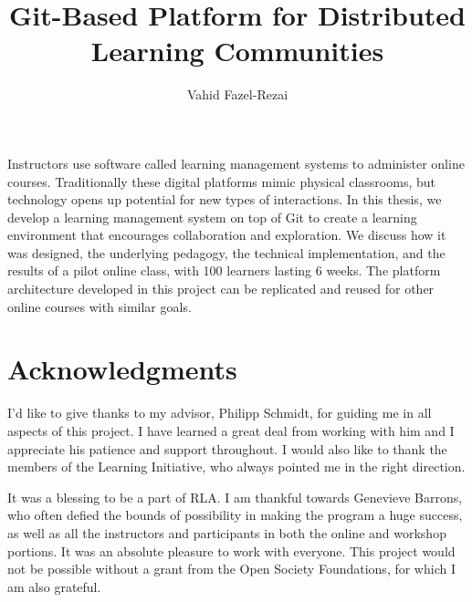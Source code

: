 \documentclass[12pt,twoside]{mitthesis}
\begin{document}
\title{Git-Based Platform for Distributed Learning Communities}
\author{Vahid Fazel-Rezai}
\maketitle
\cleardoublepage
\setcounter{savepage}{\thepage}
\begin{abstractpage}
Instructors use software called learning management systems to administer online courses. Traditionally these digital platforms mimic physical classrooms, but technology opens up potential for new types of interactions. In this thesis, we develop a learning management system on top of Git to create a learning environment that encourages collaboration and exploration. We discuss how it was designed, the underlying pedagogy, the technical implementation, and the results of a pilot online class, with 100 learners lasting 6 weeks. The platform architecture developed in this project can be replicated and reused for other online courses with similar goals.
\end{abstractpage}
\cleardoublepage
\section*{Acknowledgments}
I'd like to give thanks to my advisor, Philipp Schmidt, for guiding me in all aspects of this project. I have learned a great deal from working with him and I appreciate his patience and support throughout. I would also like to thank the members of the Learning Initiative, who always pointed me in the right direction.

It was a blessing to be a part of RLA. I am thankful towards Genevieve Barrons, who often defied the bounds of possibility in making the program a huge success, as well as all the instructors and participants in both the online and workshop portions. It was an absolute pleasure to work with everyone. This project would not be possible without a grant from the Open Society Foundations, for which I am also grateful.

\tableofcontents

\newpage
\listoffigures
\end{document}
